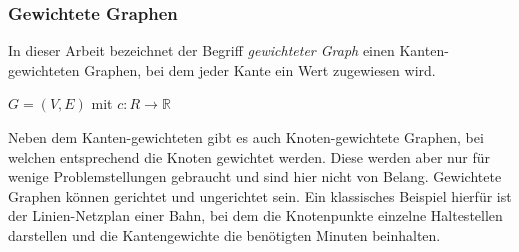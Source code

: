 \documentclass[12pt,a4paper]{article}
\begin{document}
\subsubsection{Gewichtete Graphen}
In dieser Arbeit bezeichnet der Begriff \textit{gewichteter Graph} einen Kanten-gewichteten Graphen, bei dem jeder Kante ein Wert zugewiesen wird.

$G = (V,E)$ mit $c: R \rightarrow \mathbb{R}$

Neben dem Kanten-gewichteten gibt es auch Knoten-gewichtete Graphen, bei welchen entsprechend die Knoten gewichtet werden. Diese werden aber nur für wenige Problemstellungen gebraucht und sind hier nicht von Belang. Gewichtete Graphen können gerichtet und ungerichtet sein. Ein klassisches Beispiel hierfür ist der Linien-Netzplan einer Bahn, bei dem die Knotenpunkte einzelne Haltestellen darstellen und die Kantengewichte die benötigten Minuten beinhalten.
\end{document}
